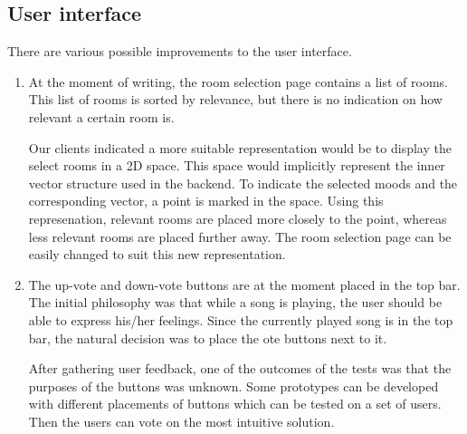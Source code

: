 \subsection{User interface}
There are various possible improvements to the user interface.

\begin{enumerate}
\item At the moment of writing, the room selection page contains a list of rooms.
This list of rooms is sorted by relevance, but there is no indication on how relevant a certain room is.

Our clients indicated a more suitable representation would be to display the select rooms in a 2D space.
This space would implicitly represent the inner vector structure used in the backend.
To indicate the selected moods and the corresponding vector, a point is marked in the space.
Using this represenation, relevant rooms are placed more closely to the point, whereas less relevant rooms are placed further away. The room selection page can be easily changed to suit this new representation.

\item The up-vote and down-vote buttons are at the moment placed in the top bar.
The initial philosophy was that while a song is playing, the user should be able to express his/her feelings.
Since the currently played song is in the top bar, the natural decision was to place the ote buttons next to it.

After gathering user feedback, one of the outcomes of the tests was that the purposes of the buttons was unknown.
Some prototypes can be developed with different placements of buttons which can be tested on a set of users.
Then the users can vote on the most intuitive solution.
\end{enumerate}
